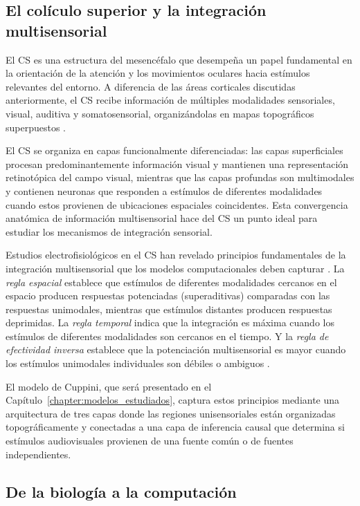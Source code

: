 \subsection{El colículo superior y la integración multisensorial}
\label{subsec:coliculo_superior}

El \acrfull{CS} es una estructura del mesencéfalo que desempeña un papel fundamental en la orientación de la atención y los movimientos oculares hacia estímulos relevantes del entorno. A diferencia de las áreas corticales discutidas anteriormente, el \acrshort{CS} recibe información de múltiples modalidades sensoriales, visual, auditiva y somatosensorial, organizándolas en mapas topográficos superpuestos \citep{stein2012new}.

El \acrshort{CS} se organiza en capas funcionalmente diferenciadas: las capas superficiales procesan predominantemente información visual y mantienen una representación retinotópica del campo visual, mientras que las capas profundas son multimodales y contienen neuronas que responden a estímulos de diferentes modalidades cuando estos provienen de ubicaciones espaciales coincidentes. Esta convergencia anatómica de información multisensorial hace del \acrshort{CS} un punto ideal para estudiar los mecanismos de integración sensorial.

Estudios electrofisiológicos en el \acrshort{CS} han revelado principios fundamentales de la integración multisensorial que los modelos computacionales deben capturar \citep{stein2012new, paredes2025scikit}. La \textit{regla espacial} establece que estímulos de diferentes modalidades cercanos en el espacio producen respuestas potenciadas (superaditivas) comparadas con las respuestas unimodales, mientras que estímulos distantes producen respuestas deprimidas. La \textit{regla temporal} indica que la integración es máxima cuando los estímulos de diferentes modalidades son cercanos en el tiempo. Y la \textit{regla de efectividad inversa} establece que la potenciación multisensorial es mayor cuando los estímulos unimodales individuales son débiles o ambiguos \citep{cuppini2017biologically}.

El modelo de Cuppini, que será presentado en el Capítulo~\ref{chapter:modelos_estudiados}, captura estos principios mediante una arquitectura de tres capas donde las regiones unisensoriales están organizadas topográficamente y conectadas a una capa de inferencia causal que determina si estímulos audiovisuales provienen de una fuente común o de fuentes independientes.

\subsection{De la biología a la computación}
\label{subsec:sintesis_biologia}

